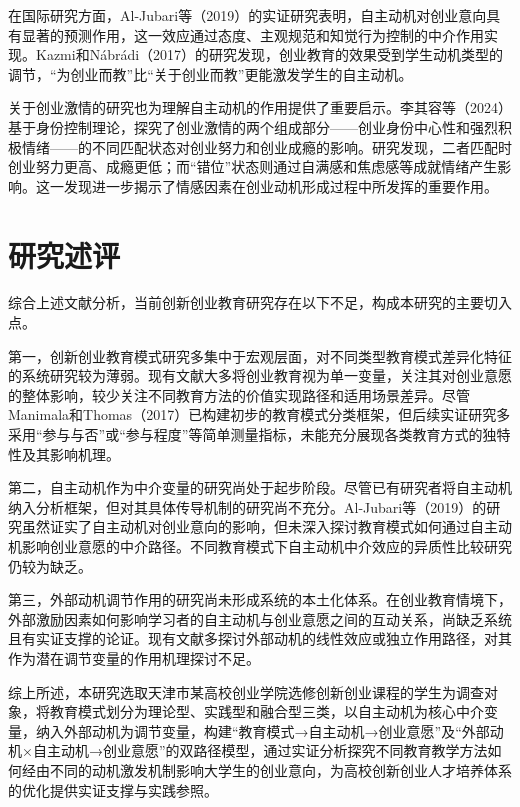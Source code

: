 在国际研究方面，Al-Jubari等\nolinebreak[3]（2019）的实证研究表明，自主动机对创业意向具有显著的预测作用，这一效应通过态度、主观规范和知觉行为控制的中介作用实现\cite{AlJubari2019}。Kazmi和Nábrádi\nolinebreak[3]（2017）的研究发现，创业教育的效果受到学生动机类型的调节，\nolinebreak[3]“为创业而教”比\nolinebreak[3]“关于创业而教”更能激发学生的自主动机\cite{Kazmi2017}。

关于创业激情的研究也为理解自主动机的作用提供了重要启示。李其容等\nolinebreak[3]（2024）基于身份控制理论，探究了创业激情的两个组成部分——创业身份中心性和强烈积极情绪——的不同匹配状态对创业努力和创业成瘾的影响\cite{liqirong2024}。研究发现，二者匹配时创业努力更高、成瘾更低；而\nolinebreak[3]“错位”状态则通过自满感和焦虑感等成就情绪产生影响。这一发现进一步揭示了情感因素在创业动机形成过程中所发挥的重要作用。

\section{研究述评}

综合上述文献分析，当前创新创业教育研究存在以下不足，构成本研究的主要切入点。

第一，创新创业教育模式研究多集中于宏观层面，对不同类型教育模式差异化特征的系统研究较为薄弱。现有文献大多将创业教育视为单一变量，关注其对创业意愿的整体影响，较少关注不同教育方法的价值实现路径和适用场景差异。尽管Manimala和Thomas\nolinebreak[3]（2017）已构建初步的教育模式分类框架\cite{Manimala2017}，但后续实证研究多采用\nolinebreak[3]“参与与否”或\nolinebreak[3]“参与程度”等简单测量指标，未能充分展现各类教育方式的独特性及其影响机理。

第二，自主动机作为中介变量的研究尚处于起步阶段。尽管已有研究者将自主动机纳入分析框架，但对其具体传导机制的研究尚不充分。Al-Jubari等\nolinebreak[3]（2019）的研究虽然证实了自主动机对创业意向的影响\cite{AlJubari2019}，但未深入探讨教育模式如何通过自主动机影响创业意愿的中介路径。不同教育模式下自主动机中介效应的异质性比较研究仍较为缺乏。

第三，外部动机调节作用的研究尚未形成系统的本土化体系。在创业教育情境下，外部激励因素如何影响学习者的自主动机与创业意愿之间的互动关系，尚缺乏系统且有实证支撑的论证。现有文献多探讨外部动机的线性效应或独立作用路径，对其作为潜在调节变量的作用机理探讨不足。

综上所述，本研究选取天津市某高校创业学院选修创新创业课程的学生为调查对象，将教育模式划分为理论型、实践型和融合型三类，以自主动机为核心中介变量，纳入外部动机为调节变量，构建\nolinebreak[3]“教育模式→自主动机→创业意愿”及\nolinebreak[3]“外部动机×自主动机→创业意愿”的双路径模型，通过实证分析探究不同教育教学方法如何经由不同的动机激发机制影响大学生的创业意向，为高校创新创业人才培养体系的优化提供实证支撑与实践参照。

\clearpage
